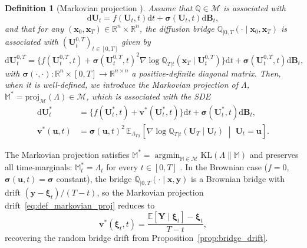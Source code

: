 \documentclass{article}
\newtheorem{defn}[thm]{Definition}
\def\R{\mathbb{R}}
\def\E{\mathbb{E}}
\def\dd{\mathrm{d}}
\def\xib{\boldsymbol{\xi}}
\DeclareMathOperator*{\argmin}{argmin}
\theoremstyle{definition}
\begin{document}
\begin{defn}[Markovian projection {\cite[Definition~1]{shi2023diffusion}}]
\label{def:markovian}
Assume that $\mathbb{Q} \in \mathcal{M}$ is associated with
\begin{equation*}
    \dd\boldsymbol{U}_t = f(\boldsymbol{U}_t, t)\dd t + \boldsymbol{\sigma}(\boldsymbol{U}_t, t)\dd\boldsymbol{B}_t,
\end{equation*}
and that for any $(\boldsymbol{x}_0, \boldsymbol{x}_T) \in \R^n \times \R^n$, the diffusion bridge $\mathbb{Q}_{|0,T}(\cdot \mid \boldsymbol{x}_0, \boldsymbol{x}_T)$ is associated with $(\boldsymbol{U}_t^{0,T})_{t \in [0,T]}$ given by
\begin{equation*}
    \dd\boldsymbol{U}_t^{0,T} = \{f(\boldsymbol{U}_t^{0,T}, t) + \boldsymbol{\sigma}(\boldsymbol{U}_t^{0,T}, t)^2 \nabla \log \mathbb{Q}_{T|t}(\boldsymbol{x}_T \mid \boldsymbol{U}_t^{0,T})\}\dd t + \boldsymbol{\sigma}(\boldsymbol{U}_t^{0,T}, t)\dd\boldsymbol{B}_t,
\end{equation*}
with $\boldsymbol{\sigma}(\cdot, \cdot) : \R^n \times [0, T] \to \R^{n \times n}$ a positive-definite diagonal matrix. Then, when it is well-defined, we introduce the \emph{Markovian projection} of $\Lambda$, $\mathbb{M}^* = \mathrm{proj}_{\mathcal{M}}(\Lambda) \in \mathcal{M}$, which is associated with the SDE
\begin{align}
    \dd\boldsymbol{U}_t^* &= \{f(\boldsymbol{U}_t^*, t) + \boldsymbol{v}^*(\boldsymbol{U}_t^*, t)\}\dd t + \boldsymbol{\sigma}(\boldsymbol{U}_t^*, t)\dd\boldsymbol{B}_t,\nonumber \\
    \boldsymbol{v}^*(\boldsymbol{u}, t) &= \boldsymbol{\sigma}(\boldsymbol{u}, t)^2\,\E_{\Lambda_{T|t}}\!\left[\nabla \log \mathbb{Q}_{T|t}(\boldsymbol{U}_T \mid \boldsymbol{U}_t) \;\middle|\; \boldsymbol{U}_t = \boldsymbol{u}\right]. \label{eq:def_markovian_proj}
\end{align}
\end{defn}

The Markovian projection satisfies $\mathbb{M}^* = \argmin_{\mathbb{M} \in \mathcal{M}} \mathrm{KL}(\Lambda \| \mathbb{M})$ and preserves all time-marginals: $\mathbb{M}^*_t = \Lambda_t$ for every $t \in [0, T]$ \cite[Proposition~2]{shi2023diffusion}. In the Brownian case ($f = 0$, $\boldsymbol{\sigma}(\boldsymbol{u}, t) = \boldsymbol{\sigma}$ constant), the bridge $\mathbb{Q}_{|0,T}(\cdot \mid \boldsymbol{x}, \boldsymbol{y})$ is a Brownian bridge with drift $(\boldsymbol{y} - \xib_t)/(T-t)$, so the Markovian projection drift~\eqref{eq:def_markovian_proj} reduces to
\begin{equation}
    \boldsymbol{v}^*(\xib_t, t) = \frac{\E[\boldsymbol{Y} \mid \xib_t] - \xib_t}{T - t}, \label{eq:markov_drift}
\end{equation}
recovering the random bridge drift from Proposition~\ref{prop:bridge_drift}.
\end{document}

